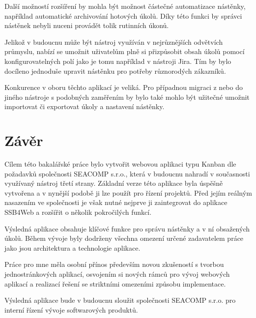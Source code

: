 Další možností rozšíření by mohla být možnost částečné automatizace nástěnky, například automatické archivování hotových úkolů. Díky této funkci by správci nástěnek nebyli nuceni provádět tolik rutinních úkonů. 

Jelikož v budoucnu může být nástroj využíván v nejrůznějších odvětvích průmyslu, nabízí se umožnit uživatelům plně si přizpůsobit obsah úkolů pomocí konfigurovatelných polí jako je tomu například v nástroji Jira. Tím by bylo docíleno jednoduše upravit nástěnku pro potřeby různorodých zákazníků.

Konkurence v oboru těchto aplikací je veliká. Pro případnou migraci z nebo do jiného nástroje s podobných zaměřením by bylo také mohlo být užitečné umožnit importovat či exportovat úkoly a nastavení nástěnky.




\chapter{Závěr}
Cílem této bakalářské práce bylo vytvořit webovou aplikaci typu Kanban dle požadavků společnosti SEACOMP s.r.o., která v budoucnu nahradí v současnosti využívaný nástroj třetí strany. Základní verze této aplikace byla úspěšně vytvořena a v nynější podobě ji lze použít pro řízení projektů. Před jejím reálným nasazením ve společnosti je však nutné nejprve ji zaintegrovat do aplikace SSB4Web a rozšířit o několik pokročilých funkcí.

Výsledná aplikace obsahuje klíčové funkce pro správu nástěnky a v ní obsažených úkolů. Během vývoje byly dodrženy všechna omezení určené zadavatelem práce jako jsou architektura a technologie aplikace.

Práce pro mne měla osobní přínos především novou zkušeností s tvorbou jednostránkových aplikací, osvojením si nových rámců pro vývoj webových aplikací a realizací řešení se striktními omezeními způsobu implementace.

Výsledná aplikace bude v budoucnu sloužit společnosti SEACOMP s.r.o. pro interní řízení vývoje softwarových produktů.

